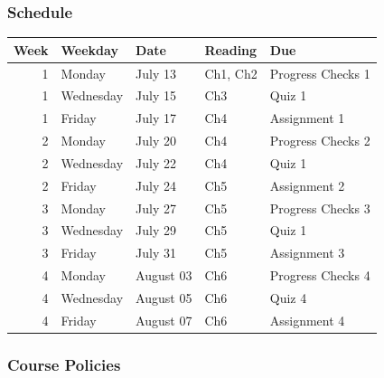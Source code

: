 \documentclass[
]{article}
\begin{document}
\hypertarget{schedule}{%
\subsubsection{Schedule}\label{schedule}}

\begin{table}[H]
\centering
\begin{tabular}{r|l|l|l|l}
\hline
Week & Weekday & Date & Reading & Due\\
\hline
1 & Monday & July 13 & Ch1, Ch2 & Progress Checks 1\\
\hline
1 & Wednesday & July 15 & Ch3 & Quiz 1\\
\hline
1 & Friday & July 17 & Ch4 & Assignment 1\\
\hline
2 & Monday & July 20 & Ch4 & Progress Checks 2\\
\hline
2 & Wednesday & July 22 & Ch4 & Quiz 1\\
\hline
2 & Friday & July 24 & Ch5 & Assignment 2\\
\hline
3 & Monday & July 27 & Ch5 & Progress Checks 3\\
\hline
3 & Wednesday & July 29 & Ch5 & Quiz 1\\
\hline
3 & Friday & July 31 & Ch5 & Assignment 3\\
\hline
4 & Monday & August 03 & Ch6 & Progress Checks 4\\
\hline
4 & Wednesday & August 05 & Ch6 & Quiz 4\\
\hline
4 & Friday & August 07 & Ch6 & Assignment 4\\
\hline
\end{tabular}
\end{table}

\hypertarget{course-policies}{%
\subsubsection{Course Policies}\label{course-policies}}
\end{document}
